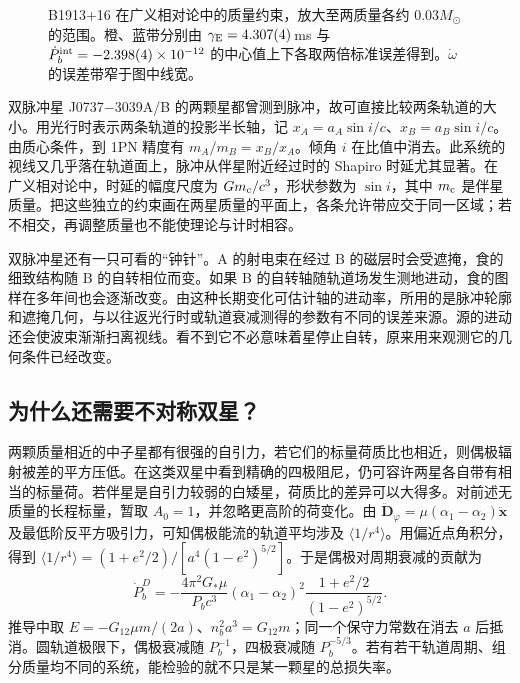 \begin{figure}[htbp]
    \caption{B1913+16 在广义相对论中的质量约束，放大至两质量各约 $0.03M_\odot$ 的范围。橙、蓝带分别由 $\gamma_{\rm E}=4.307(4)$\,ms 与 $\dot P_b^{\rm int}=-2.398(4)\times10^{-12}$ 的中心值上下各取两倍标准误差得到。$\dot\omega$ 的误差带窄于图中线宽。}
    \label{fig:exp-b1913-mass}
\end{figure}

双脉冲星 J0737$-$3039A/B 的两颗星都曾测到脉冲，故可直接比较两条轨道的大小。用光行时表示两条轨道的投影半长轴，记 $x_A=a_A\sin i/c$、$x_B=a_B\sin i/c$。由质心条件，到 1PN 精度有 $m_A/m_B=x_B/x_A$。倾角 $i$ 在比值中消去。此系统的视线又几乎落在轨道面上，脉冲从伴星附近经过时的 Shapiro 时延尤其显著。在广义相对论中，时延的幅度尺度为 $Gm_{\rm c}/c^3$，形状参数为 $\sin i$，其中 $m_{\rm c}$ 是伴星质量。把这些独立的约束画在两星质量的平面上，各条允许带应交于同一区域；若不相交，再调整质量也不能使理论与计时相容。

双脉冲星还有一只可看的“钟针”。A 的射电束在经过 B 的磁层时会受遮掩，食的细致结构随 B 的自转相位而变。如果 B 的自转轴随轨道场发生测地进动，食的图样在多年间也会逐渐改变。由这种长期变化可估计轴的进动率，所用的是脉冲轮廓和遮掩几何，与以往返光行时或轨道衰减测得的参数有不同的误差来源。源的进动还会使波束渐渐扫离视线。看不到它不必意味着星停止自转，原来用来观测它的几何条件已经改变。

\subsection{为什么还需要不对称双星？}

两颗质量相近的中子星都有很强的自引力，若它们的标量荷质比也相近，则偶极辐射被差的平方压低。在这类双星中看到精确的四极阻尼，仍可容许两星各自带有相当的标量荷。若伴星是自引力较弱的白矮星，荷质比的差异可以大得多。对前述无质量的长程标量，暂取 $A_0=1$，并忽略更高阶的荷变化。由 $\ddot{\bm D}_\varphi=\mu(\alpha_1-\alpha_2)\ddot{\bm x}$ 及最低阶反平方吸引力，可知偶极能流的轨道平均涉及 $\langle 1/r^4\rangle$。用偏近点角积分，得到 $\langle 1/r^4\rangle=(1+e^2/2)/[a^4(1-e^2)^{5/2}]$。于是偶极对周期衰减的贡献为
\[
 \dot P_b^{D}=-\frac{4\pi^2G_*\mu}{P_b c^3}
       (\alpha_1-\alpha_2)^2
       \frac{1+e^2/2}{(1-e^2)^{5/2}} .
\]
推导中取 $E=-G_{12}\mu m/(2a)$、$n_b^2a^3=G_{12}m$；同一个保守力常数在消去 $a$ 后抵消。圆轨道极限下，偶极衰减随 $P_b^{-1}$，四极衰减随 $P_b^{-5/3}$。若有若干轨道周期、组分质量均不同的系统，能检验的就不只是某一颗星的总损失率。

